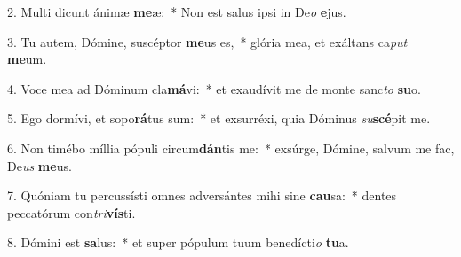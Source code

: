 2. Multi dicunt ánimæ \textbf{me}æ:~*  Non est salus ipsi in De\textit{o} \textbf{e}jus.\

3. Tu autem, Dómine, suscéptor \textbf{me}us es,~*  glória mea, et exáltans ca\textit{put} \textbf{me}um.\

4. Voce mea ad Dóminum cla\textbf{má}vi:~*  et exaudívit me de monte sanc\textit{to} \textbf{su}o.\

5. Ego dormívi, et sopo\textbf{rá}tus sum:~*  et exsurréxi, quia Dóminus \textit{su}\textbf{scé}pit me.\

6. Non timébo míllia pópuli circum\textbf{dán}tis me:~*  exsúrge, Dómine, salvum me fac, De\textit{us} \textbf{me}us.\

7. Quóniam tu percussísti omnes adversántes mihi sine \textbf{cau}sa:~*  dentes peccatórum con\textit{tri}\textbf{vís}ti.\

8. Dómini est \textbf{sa}lus:~*  et super pópulum tuum benedícti\textit{o} \textbf{tu}a.\

